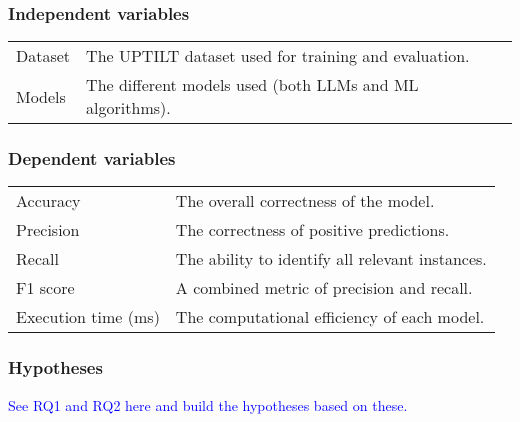 \subsubsection{Independent variables}
%
%
%
\begin{center}
    \begin{tabular}{| l | l |}
        Dataset & The UPTILT dataset used for training and evaluation.     \\
        Models  & The different models used (both LLMs and ML algorithms). \\
    \end{tabular}
\end{center}

\subsubsection{Dependent variables}
%
\begin{center}
    \begin{tabular}{| l | l |}
        Accuracy            & The overall correctness of the model.           \\
        Precision           & The correctness of positive predictions.        \\
        Recall              & The ability to identify all relevant instances. \\
        F1 score            & A combined metric of precision and recall.      \\
        Execution time (ms) & The computational efficiency of each model.     \\
    \end{tabular}
\end{center}

\subsubsection{Hypotheses}
\textcolor{blue}{See RQ1 and RQ2 here and build the hypotheses based on these.}

